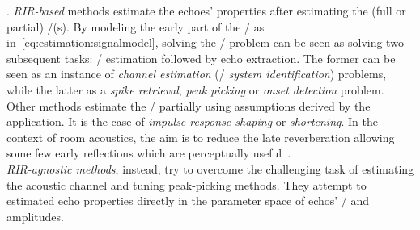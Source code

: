 .
\textit{RIR-based} methods estimate the echoes' properties after estimating the (full or partial) \RIR/(s).
By modeling the early part of the \RIR/ as in~\cref{eq:estimation:signalmodel}, solving the \AER/ problem can be seen as solving two subsequent tasks: \RIR/ estimation followed by echo extraction.
The former can be seen as an instance of \textit{channel estimation} (\aka/ \textit{system identification}) problems, while the latter as a \textit{spike retrieval}, \textit{peak picking} or \textit{onset detection} problem.
Other methods estimate the \RIRs/ partially using assumptions derived by the application.
It is the case of \textit{impulse response shaping} or \textit{shortening}.
In the context of room acoustics, the aim is to reduce the late reverberation allowing some few early reflections which are perceptually useful~.
\\\textit{RIR-agnostic methods}, instead, try to overcome the challenging task of estimating the acoustic channel and tuning peak-picking methods.
They attempt to estimated echo properties directly in the parameter space of echos' \TOAs/ and amplitudes.

\begin{figure}[h]
    \footnotesize
    \resizebox{\linewidth}{!}{
        
    }
    \vspace{-\baselineskip}\vspace{-\baselineskip}
\end{figure}



